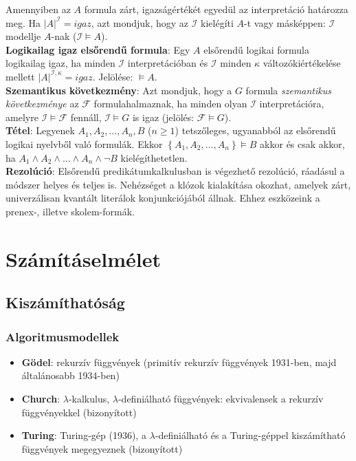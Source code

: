 \documentclass[margin=0px]{article}
\begin{document}
	Amennyiben az $A$ formula zárt, igazságértékét egyedül az interpretáció határozza meg. Ha $|A|^{\mathcal{I}} = igaz$,
	azt mondjuk, hogy az $\mathcal{I}$ kielégíti $A$-t vagy másképpen: $\mathcal{I}$ modellje $A$-nak ($\mathcal{I} \models A$).\\
	
	\noindent \textbf{Logikailag igaz elsőrendű formula}: Egy $A$ elsőrendű logikai formula logikailag igaz,
	ha minden $\mathcal{I}$ interpretációban és $\mathcal{I}$ minden $\kappa$ változókiértékelése mellett
	$|A|^{\mathcal{I},\kappa} = igaz$. Jelölése: $\models A$.\\
	
	\noindent \textbf{Szemantikus következmény}: Azt mondjuk, hogy a $G$ formula \textit{szemantikus következménye} az
	$\mathcal{F}$ formulahalmaznak, ha minden olyan $\mathcal{I}$ interpretációra, amelyre $\mathcal{I} \models \mathcal{F}$
	fennáll, $\mathcal{I} \models G$ is igaz (jelölés: $\mathcal{F} \models G$).\\
	
	\noindent \textbf{Tétel}: Legyenek $A_{1}, A_{2}, ..., A_{n}, B$ ($n \geq 1$) tetszőleges, ugyanabból az elsőrendű logikai nyelvből
	való formulák. Ekkor $\left\{A_{1}, A_{2}, ..., A_{n}\right\} \models B$ akkor és csak akkor, ha
	$A_{1} \wedge A_{2} \wedge ... \wedge A_{n} \wedge \neg B$ kielégíthetetlen.\\
	
	\noindent \textbf{Rezolúció}: Elsőrendű predikátumkalkulusban is végezhető rezolúció, ráadásul a módszer
	helyes és teljes is. Nehézséget a klózok kialakítása okozhat, amelyek zárt,
	univerzálisan kvantált literálok konjunkciójából állnak. Ehhez eszközeink a
	prenex-, illetve skolem-formák.
	
	\section{Számításelmélet}
	
	\subsection{Kiszámíthatóság}
	
	\subsubsection{Algoritmusmodellek}
	
	\begin{itemize}
		\item	\textbf{Gödel}: rekurzív függvények (primitív rekurzív függvények 1931-ben, majd általánosabb 1934-ben)
		
		\item	\textbf{Church}: $\lambda$-kalkulus, $\lambda$-definiálható függvények: ekvivalensek a rekurzív függvényekkel (bizonyított)
		
		\item	\textbf{Turing}: Turing-gép (1936), a $\lambda$-definiálható és a Turing-géppel kiszámítható függvények megegyeznek (bizonyított)

	\end{itemize}
	
\end{document}

